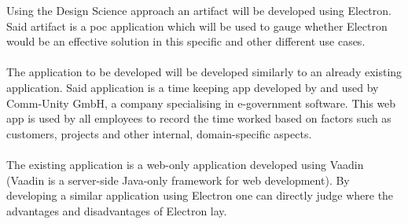 
Using the Design Science approach \parencite{VaishnaviVijayKuechler} an artifact will be developed using Electron.
Said artifact is a \acrfull{poc} application which will be used to gauge whether Electron would be an effective
solution in this specific and other different use cases. \paragraph{}
The application to be developed will be developed similarly to an already existing application.
Said application is a time keeping app developed by and used by Comm-Unity GmbH, a company specialising in e-government
software.
This web app is used by all employees to record the time worked based on factors such as customers, projects and other
internal, domain-specific aspects.\paragraph{}
The existing application is a web-only application developed using Vaadin 
(Vaadin is a server-side Java-only framework for web development)\parencite{vaadinDocs}.
By developing a similar application using Electron one can directly judge where the advantages and 
disadvantages of Electron lay. 
